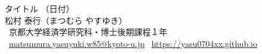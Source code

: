 \documentclass[a4paper,12pt]{ltjsarticle}
\begin{document}
\noindent
{\huge{タイトル}} {\large{ \hfill （日付）
\medskip
\\
{松村 泰行}}}（まつむら やすゆき）\\
\,{\faGraduationCap} {京都大学経済学研究科・博士後期課程１年} \\
\, \href{mailto:matsumura.yasuyuki.w85@kyoto-u.jp}{\textsf{matsumura.yasuyuki.w85@kyoto-u.jp}}
\, \href{https://yasu0704xx.github.io}{\textsf{https://yasu0704xx.github.io}}  \\
\hrulefill
\section{}


\end{document}
